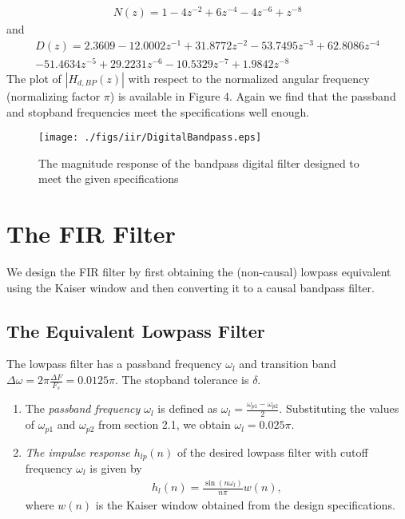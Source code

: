 \documentclass[journal,12pt,twocolumn]{IEEEtran}
\begin{document}
\begin{eqnarray}
N(z)=  1 - 4 z^{-2} + 6 z^{-4} - 4z^{-6} + z^{-8} 
\end{eqnarray}
and
\begin{eqnarray}
D(z) = 2.3609  -12.0002z^{-1} + 31.8772z^{-2}  -53.7495z^{-3}+  62.8086z^{-4}\nonumber \\
  -51.4634z^{-5}+   29.2231z^{-6}  -10.5329z^{-7} +   1.9842z^{-8}
\end{eqnarray}
The plot of $|H_{d,BP}(z)|$ with respect to the normalized angular frequency (normalizing factor $\pi$) is available in Figure 4.  Again we
find that the passband and stopband frequencies meet the specifications well enough.

\begin{figure}
\label{fig4}
\texttt{[image: ./figs/iir/DigitalBandpass.eps]}
\caption{The magnitude response of the bandpass digital filter designed to meet the given specifications} 
\end{figure}


\section{The FIR Filter}
We design the FIR filter by first obtaining the (non-causal) lowpass equivalent using the Kaiser window
and then
converting it to a causal bandpass filter.

\subsection{The Equivalent Lowpass Filter}
The lowpass filter has a passband frequency $\omega_l$ and transition band $\Delta \omega = 2\pi \frac{\Delta F}{F_s} = 0.0125\pi$.
The stopband tolerance is $\delta$.
\begin{enumerate}
\item  The {\em passband frequency $\omega_l$}  is defined as $\omega_l = \frac{\omega_{p1} - \omega_{p2}}{2}$.  Substituting the values of $\omega_{p1}$ and $\omega_{p2}$ from section 2.1, we obtain $\omega_l = 0.025\pi$.

\item {\em The impulse response $h_{lp}(n)$} of the desired lowpass filter with cutoff frequency $\omega_l$
is given by
\begin{eqnarray}
\label{firlpdef}
h_l(n) = \frac{\sin(n\omega_l)}{n\pi}w(n),
\end{eqnarray}
where $w(n)$ is the Kaiser window obtained from the design specifications.
\end{enumerate}
\end{document}
